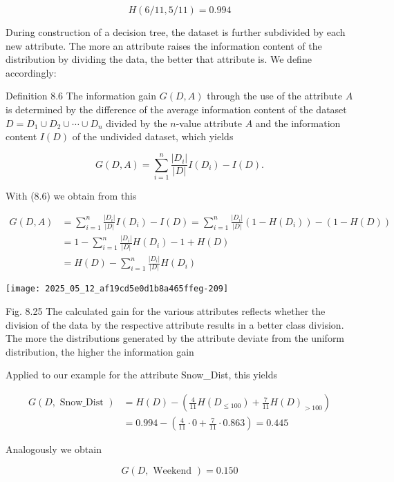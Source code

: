 \documentclass[10pt]{article}
\begin{document}
$$
H(6 / 11,5 / 11)=0.994
$$

During construction of a decision tree, the dataset is further subdivided by each new attribute. The more an attribute raises the information content of the distribution by dividing the data, the better that attribute is. We define accordingly:

Definition 8.6 The information gain $G(D, A)$ through the use of the attribute $A$ is determined by the difference of the average information content of the dataset $D=D_{1} \cup D_{2} \cup \cdots \cup D_{n}$ divided by the $n$-value attribute $A$ and the information content $I(D)$ of the undivided dataset, which yields

$$
G(D, A)=\sum_{i=1}^{n} \frac{\left|D_{i}\right|}{|D|} I\left(D_{i}\right)-I(D) .
$$

With (8.6) we obtain from this


\begin{align*}
G(D, A) & =\sum_{i=1}^{n} \frac{\left|D_{i}\right|}{|D|} I\left(D_{i}\right)-I(D)=\sum_{i=1}^{n} \frac{\left|D_{i}\right|}{|D|}\left(1-H\left(D_{i}\right)\right)-(1-H(D)) \\
& =1-\sum_{i=1}^{n} \frac{\left|D_{i}\right|}{|D|} H\left(D_{i}\right)-1+H(D) \\
& =H(D)-\sum_{i=1}^{n} \frac{\left|D_{i}\right|}{|D|} H\left(D_{i}\right) \tag{8.7}
\end{align*}


\begin{center}
\texttt{[image: 2025\_05\_12\_af19cd5e0d1b8a465ffeg-209]}
\end{center}

Fig. 8.25 The calculated gain for the various attributes reflects whether the division of the data by the respective attribute results in a better class division. The more the distributions generated by the attribute deviate from the uniform distribution, the higher the information gain

Applied to our example for the attribute Snow\_Dist, this yields

$$
\begin{aligned}
G(D, \text { Snow_Dist }) & =H(D)-\left(\frac{4}{11} H\left(D_{\leq 100}\right)+\frac{7}{11} H(D)_{>100}\right) \\
& =0.994-\left(\frac{4}{11} \cdot 0+\frac{7}{11} \cdot 0.863\right)=0.445
\end{aligned}
$$

Analogously we obtain

$$
G(D, \text { Weekend })=0.150
$$
\end{document}
